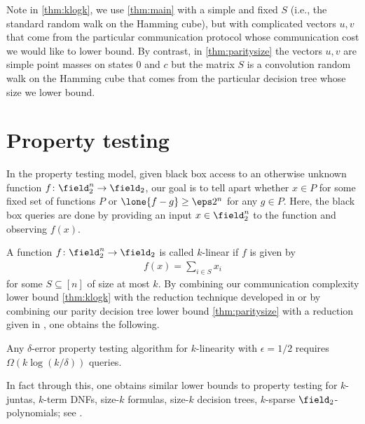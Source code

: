 Note in \autoref{thm:klogk}, we use \autoref{thm:main} with a 
simple and fixed $S$ 
(i.e., the standard random walk on the Hamming cube), 
but with complicated vectors $u,v$ that come from the particular 
communication protocol whose communication cost we would like 
to lower bound. By contrast, in \autoref{thm:paritysize} the 
vectors $u,v$ are simple point masses on states $0$ and $c$ but 
the matrix $S$ is a convolution random walk on the Hamming cube 
that comes from the particular decision tree whose size we lower 
bound.

\section{Property testing}
\label{sec:ham:proptest}
In the property testing model, given black box access to 
an otherwise unknown function $f\colon\field^n_2\to\field_2$, 
our goal is to tell apart whether $x\in P$ for some fixed set 
of functions $P$ or $\lone{f-g}\ge \eps2^n$ for any $g\in P$. 
Here, the black box queries are done by providing an input 
$x\in\field_2^n$ to the function and observing $f(x)$.

A function $f\colon\field_2^n\to\field_2$ is
called $k$-linear if $f$ is given by
\begin{align*}
f(x) = \sum_{i\in S}x_i
\end{align*} 
for some $S\subseteq[n]$ of size at most $k$.
By combining our communication complexity lower bound 
\autoref{thm:klogk} with the reduction technique developed 
in \cite{BlaisBM2012} or by combining
our parity decision tree lower bound \autoref{thm:paritysize} 
with a reduction given in \cite{BhrushundiCK2014}, one obtains 
the following.

\begingroup
\def\thecorollary{\ref{cor:propertytest}}
\begin{corollary}[restated]
Any $\delta$-error property testing algorithm for 
$k$-linearity with $\epsilon=1/2$ requires 
$\Omega(k\log (k/\delta))$ queries.
\end{corollary}
\addtocounter{theorem}{-1}
\endgroup
In fact through this, one obtains similar lower bounds to
property testing for $k$-juntas, $k$-term DNFs, size-$k$ formulas,
size-$k$ decision trees, $k$-sparse $\field_2$-polynomials;
see \cite{Blais2009, ChakrabortyGM2011}.
